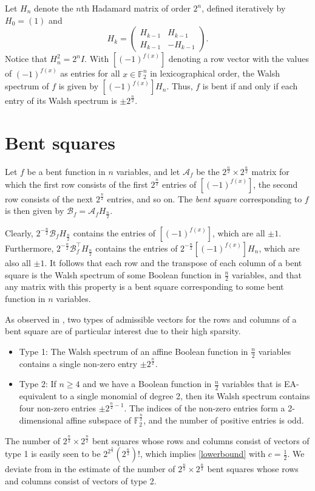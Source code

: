 \documentclass{article}
\theoremstyle{definition}
\theoremstyle{remark}
\theoremstyle{definition}
\newcommand{\F}{\mathbb{F}}
\begin{document}
Let $H_n$ denote the $n$th Hadamard matrix of order $2^n$, defined iteratively by $H_0 = (1)$ and $$H_k=\left( \begin{matrix} H_{k-1} & H_{k-1} \\ H_{k-1} & -H_{k-1} \end{matrix} \right).$$ Notice that $H_n^2 = 2^n I$. With $[(-1)^{f(x)}]$ denoting a row vector with the values of $(-1)^{f(x)}$ as entries for all $x\in \F_2^n$ in lexicographical order, the Walsh spectrum of $f$ is given by $[(-1)^{f(x)}] H_n$. Thus, $f$ is bent if and only if each entry of its Walsh spectrum is $\pm 2^{\frac{n}{2}}$.

\section{Bent squares}
Let $f$ be a bent function in $n$ variables, and let $\mathcal{A}_f$ be the $2^{\frac{n}{2}} \times 2^{\frac{n}{2}}$ matrix for which the first row consists of the first $2^{\frac{n}{2}}$ entries of $[(-1)^{f(x)}]$, the second row consists of the next $2^{\frac{n}{2}}$ entries, and so on. The \textit{bent square} corresponding to $f$ is then given by $\mathcal{B}_f = \mathcal{A}_f H_{\frac{n}{2}}$.

Clearly, $2^{-\frac{n}{2}} \mathcal{B}_f H_{\frac{n}{2}}$ contains the entries of $[(-1)^{f(x)}]$, which are all $\pm 1$. Furthermore, $2^{-\frac{n}{2}} \mathcal{B}_f^\intercal H_{\frac{n}{2}}$ contains the entries of $2^{-\frac{n}{2}} [(-1)^{f(x)}] H_n$, which are also all $\pm 1$. It follows that each row and the transpose of each column of a bent square is the Walsh spectrum of some Boolean function in $\frac{n}{2}$ variables, and that any matrix with this property is a bent square corresponding to some bent function in $n$ variables.

As observed in \cite{agievich}, two types of admissible vectors for the rows and columns of a bent square are of particular interest due to their high sparsity.

\begin{itemize}
\item Type 1: The Walsh spectrum of an affine Boolean function in $\frac{n}{2}$ variables contains a single non-zero entry $\pm 2^{\frac{n}{2}}$.
\item Type 2: If $n \geq 4$ and we have a Boolean function in $\frac{n}{2}$ variables that is EA-equivalent to a single monomial of degree 2, then its Walsh spectrum contains four non-zero entries $\pm 2^{\frac{n}{2}-1}$. The indices of the non-zero entries form a 2-dimensional affine subspace of $\F_2^{\frac{n}{2}}$, and the number of positive entries is odd.
\end{itemize}
The number of $2^{\frac{n}{2}} \times 2^{\frac{n}{2}}$ bent squares whose rows and columns consist of vectors of type 1 is easily seen to be $2^{2^{\frac{n}{2}}}\left(2^{\frac{n}{2}}\right)!$, which implies \eqref{lowerbound} with $c=\frac{1}{2}$. We deviate from \cite{agievich} in the estimate of the number of $2^{\frac{n}{2}} \times 2^{\frac{n}{2}}$ bent squares whose rows and columns consist of vectors of type 2.
\end{document}
